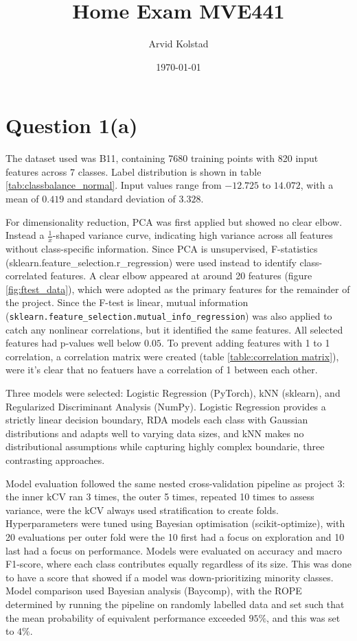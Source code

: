\documentclass[11pt]{article}
\title{Home Exam MVE441}
\author{Arvid Kolstad}
\date{\today}
\begin{document}
\maketitle
\section{Question 1(a)}


The dataset used was B11, containing 7680 training points with 820 input features across 7 classes. Label distribution is shown in table \ref{tab:classbalance_normal}. Input values range from $-12.725$ to $14.072$, with a mean of $0.419$ and standard deviation of $3.328$.

For dimensionality reduction, PCA was first applied but showed no clear elbow. Instead a $\frac{1}{x}$-shaped variance curve, indicating high variance across all features without class-specific information. Since PCA is unsupervised, F-statistics (sklearn.feature\_selection.r\_regression) were used instead to identify class-correlated features. A clear elbow appeared at around 20 features (figure \ref{fig:ftest_data}), which were adopted as the primary features for the remainder of the project. Since the F-test is linear, mutual information (\texttt{sklearn.feature\_selection.mutual\_info\_regression}) was also applied to catch any nonlinear correlations, but it identified the same features. All selected features had p-values well below $0.05$. To prevent adding features with 1 to 1 correlation, a correlation matrix were created (table \ref{table:correlation matrix}), were it's clear that no featuers have a correlation of 1 between each other.

Three models were selected: Logistic Regression (PyTorch), kNN (sklearn), and Regularized Discriminant Analysis (NumPy). Logistic Regression provides a strictly linear decision boundary, RDA models each class with Gaussian distributions and adapts well to varying data sizes, and kNN makes no distributional assumptions while capturing highly complex boundarie, three contrasting approaches.

Model evaluation followed the same nested cross-validation pipeline as project 3: the inner kCV ran 3 times, the outer 5 times, repeated 10 times to assess variance, were the kCV always used stratification to create folds. Hyperparameters were tuned using Bayesian optimisation (scikit-optimize), with 20 evaluations per outer fold were the 10 first had a focus on exploration and 10 last had a focus on performance. Models were evaluated on accuracy and macro F1-score, where each class contributes equally regardless of its size. This was done to have a score that showed if a model was down-prioritizing minority classes. Model comparison used Bayesian analysis (Baycomp), with the ROPE determined by running the pipeline on randomly labelled data and set such that the mean probability of equivalent performance exceeded $95\%$, and this was set to $4\%$.
\end{document}
